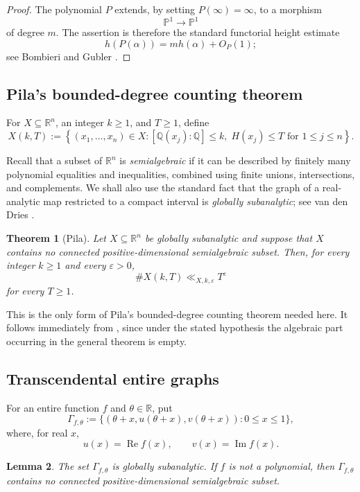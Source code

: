 \documentclass[11pt]{amsart}
\newtheorem{theorem}{Theorem}[section]
\newtheorem{lemma}[theorem]{Lemma}
\theoremstyle{remark}
\newcommand{\Q}{\mathbb{Q}}
\newcommand{\R}{\mathbb{R}}
\DeclareMathOperator{\RePart}{Re}
\DeclareMathOperator{\ImPart}{Im}
\begin{document}
\begin{proof}
The polynomial $P$ extends, by setting $P(\infty)=\infty$, to a morphism
\[
\mathbb P^1\longrightarrow\mathbb P^1
\]
of degree $m$. The assertion is therefore the standard functorial height
estimate
\[
h(P(\alpha))=m h(\alpha)+O_P(1);
\]
see Bombieri and Gubler \cite[Chapter~1]{BombieriGubler2006}.
\end{proof}

\subsection{Pila's bounded-degree counting theorem}

For $X\subseteq\R^n$, an integer $k\geq1$, and $T\geq1$, define
\[
X(k,T):=
\left\{
(x_1,\ldots,x_n)\in X:
[\Q(x_j):\Q]\leq k,\;
H(x_j)\leq T
\text{ for }1\leq j\leq n
\right\}.
\]

Recall that a subset of $\R^n$ is \emph{semialgebraic} if it can be
described by finitely many polynomial equalities and inequalities, combined
using finite unions, intersections, and complements. We shall also use
the standard fact that the graph of a real-analytic map restricted to a
compact interval is \textit{globally subanalytic}; see van den Dries
\cite{vandenDries1998}.

\begin{theorem}[Pila]\label{thm:pila}
Let $X\subseteq\R^n$ be globally subanalytic and suppose that $X$ contains
no connected positive-dimensional semialgebraic subset. Then, for every
integer $k\geq1$ and every $\varepsilon>0$,
\[
\#X(k,T)\ll_{X,k,\varepsilon}T^\varepsilon
\]
for every $T\geq1$.
\end{theorem}

This is the only form of Pila's bounded-degree counting theorem needed
here. It follows immediately from \cite[Theorem~1.6]{Pila2009}, since under
the stated hypothesis the algebraic part occurring in the general theorem
is empty.

\subsection{Transcendental entire graphs}

For an entire function $f$ and $\theta\in\R$, put
\[
\Gamma_{f,\theta}
:=
\{(\theta+x,u(\theta+x),v(\theta+x)):0\leq x\leq1\},
\]
where, for real $x$,
\[
u(x)=\RePart f(x),
\qquad
v(x)=\ImPart f(x).
\]

\begin{lemma}\label{lem:graph}
The set $\Gamma_{f,\theta}$ is globally subanalytic. If $f$ is not a
polynomial, then $\Gamma_{f,\theta}$ contains no connected
positive-dimensional semialgebraic subset.
\end{lemma}
\end{document}
